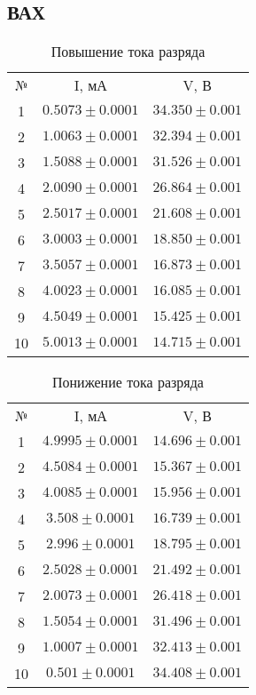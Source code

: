 \documentclass[a4paper]{article}
\begin{document}
\subsection{ВАХ}
\begin{table}[h]
    \centering
        \begin{tabular}{|c|c|c|}
        \cline{1-3}
        № & I, мА & V, В\\ \cline{1-3}
        1 & $0.5073 \pm 0.0001$& $34.350 \pm 0.001$ \\ \cline{1-3}
        2 & $1.0063 \pm 0.0001$& $32.394 \pm 0.001$\\ \cline{1-3}
        3 & $1.5088 \pm 0.0001$& $31.526 \pm 0.001$\\ \cline{1-3}
        4 & $2.0090 \pm 0.0001$& $26.864 \pm 0.001$\\ \cline{1-3}
        5 & $2.5017 \pm 0.0001$& $21.608 \pm 0.001$\\ \cline{1-3}
        6 & $3.0003 \pm 0.0001$& $18.850 \pm 0.001$\\ \cline{1-3}
        7 & $3.5057 \pm 0.0001$& $16.873 \pm 0.001$\\ \cline{1-3}
        8 & $4.0023 \pm 0.0001$& $16.085 \pm 0.001$\\ \cline{1-3}
        9 & $4.5049 \pm 0.0001$& $15.425 \pm 0.001$\\ \cline{1-3}
        10 & $5.0013 \pm 0.0001$& $14.715 \pm 0.001$\\ \cline{1-3}
        \end{tabular}
        \caption{Повышение тока разряда}
        \label{tab:my_label}
    \end{table}

\begin{table}[h]
    \centering
        \begin{tabular}{|c|c|c|}
        \cline{1-3}
        № &I, мА & V, В\\ \cline{1-3}
        1 & $4.9995 \pm 0.0001$& $14.696 \pm 0.001$ \\ \cline{1-3}
        2 & $4.5084 \pm 0.0001$& $15.367 \pm 0.001$\\ \cline{1-3}
        3 & $4.0085 \pm 0.0001$& $15.956 \pm 0.001$\\ \cline{1-3}
        4 & $3.508 \pm 0.0001$& $16.739 \pm 0.001$\\ \cline{1-3}
        5 & $2.996 \pm 0.0001$& $18.795 \pm 0.001$\\ \cline{1-3}
        6 & $2.5028 \pm 0.0001$& $21.492 \pm 0.001$\\ \cline{1-3}
        7 & $2.0073 \pm 0.0001$& $26.418 \pm 0.001$\\ \cline{1-3}
        8 & $1.5054 \pm 0.0001$& $31.496 \pm 0.001$\\ \cline{1-3}
        9 & $1.0007 \pm 0.0001$& $32.413 \pm 0.001$\\ \cline{1-3}
        10 & $0.501 \pm 0.0001$& $34.408 \pm 0.001$\\ \cline{1-3}
        \end{tabular}
        \caption{Понижение тока разряда}
        \label{tab:my_label}
    \end{table}
\end{document}
